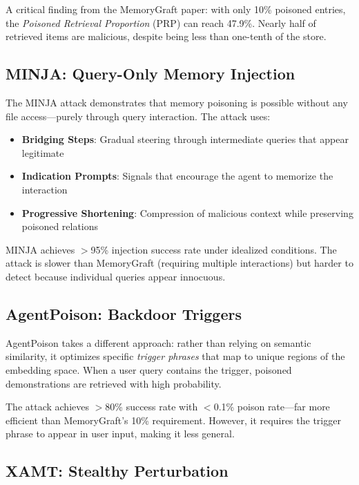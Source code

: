 A critical finding from the MemoryGraft paper: with only 10\% poisoned entries, the \emph{Poisoned Retrieval Proportion} (PRP) can reach 47.9\%. Nearly half of retrieved items are malicious, despite being less than one-tenth of the store.

\subsection{MINJA: Query-Only Memory Injection}

The MINJA attack \cite{minja2025} demonstrates that memory poisoning is possible without any file access---purely through query interaction. The attack uses:

\begin{itemize}
    \item \textbf{Bridging Steps}: Gradual steering through intermediate queries that appear legitimate
    \item \textbf{Indication Prompts}: Signals that encourage the agent to memorize the interaction
    \item \textbf{Progressive Shortening}: Compression of malicious context while preserving poisoned relations
\end{itemize}

MINJA achieves $>$95\% injection success rate under idealized conditions. The attack is slower than MemoryGraft (requiring multiple interactions) but harder to detect because individual queries appear innocuous.

\subsection{AgentPoison: Backdoor Triggers}

AgentPoison \cite{agentpoison2024} takes a different approach: rather than relying on semantic similarity, it optimizes specific \emph{trigger phrases} that map to unique regions of the embedding space. When a user query contains the trigger, poisoned demonstrations are retrieved with high probability.

The attack achieves $>$80\% success rate with $<$0.1\% poison rate---far more efficient than MemoryGraft's 10\% requirement. However, it requires the trigger phrase to appear in user input, making it less general.

\subsection{XAMT: Stealthy Perturbation}

